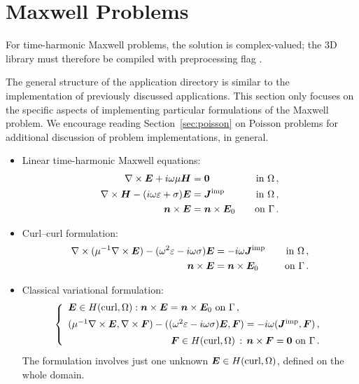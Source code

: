 %
%


\section{Maxwell Problems}
\label{sec:maxwell}

For time-harmonic Maxwell problems, the solution is complex-valued; the \hp3D library must therefore be compiled with preprocessing flag .

The general structure of the  application directory is similar to the implementation of previously discussed applications. This section only focuses on the specific aspects of implementing particular formulations of the Maxwell problem. We encourage reading Section~\ref{sec:poisson} on Poisson problems for additional discussion of problem implementations, in general.


\begin{itemize}
\item
{
Linear time-harmonic Maxwell equations:
\begin{alignat*}{3}
	\nabla \times \boldsymbol E + i \omega \mu \boldsymbol H
	&= \boldsymbol 0 &\quad \text{in } \Omega \, , \\
	\nabla \times \boldsymbol H - (i \omega \varepsilon + \sigma) \boldsymbol E 
	&= \boldsymbol J^{\text{imp}} &\quad \text{in } \Omega \, , \\
	\boldsymbol n \times \boldsymbol E &= \boldsymbol n \times \boldsymbol E_0 &\quad \text{on } \Gamma \, .
\end{alignat*}
}
\item
{
Curl--curl formulation:
\begin{alignat*}{3}
	\nabla \times (\mu^{-1} \nabla \times \boldsymbol E) - (\omega^2 \varepsilon - i \omega \sigma) \boldsymbol E
	&= -i \omega \boldsymbol J^{\text{imp}}  &\quad \text{in } \Omega \, , \\
	\boldsymbol n \times \boldsymbol E &= \boldsymbol n \times \boldsymbol E_0 &\quad \text{on } \Gamma \, .
\end{alignat*}
}
\item
{
Classical variational formulation:
\[
\left\{
\begin{array}{lll}
	\bs E \in \Hcurl : \bs n \times \bs E = \bs n \times \bs E_0 \text{ on } \Gamma \, , \\[5pt]
	(\mu^{-1} \curl \bs E,\curl \bs F) - ((\omega^2 \eps - i \omega \sigma) \bs E, \bs F)
	= -i \omega (\bs J^{\text{imp}}, \bs F) \, , \\[5pt]
	\hfill
	\quad \bs F \in \Hcurl \, : \, \bs n \times \bs F = \bs 0 \text{ on } \Gamma \, .
\end{array}
\right.
\]
The formulation involves just one unknown $\boldsymbol E \in H(\text{curl}, \Omega)$, defined on the whole domain.
}
\end{itemize}

